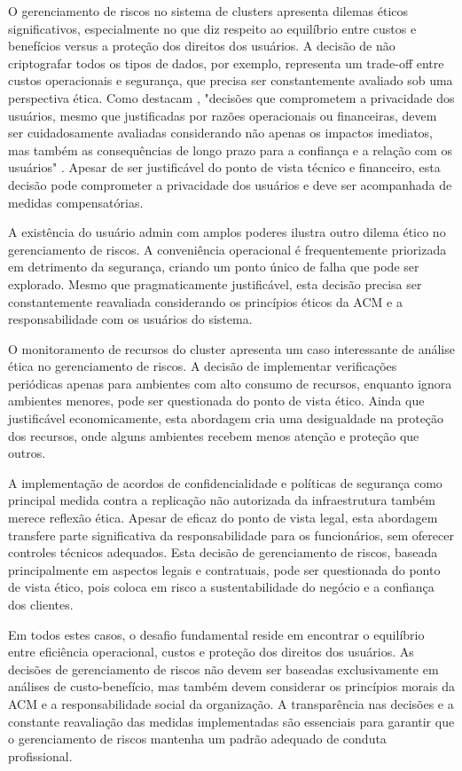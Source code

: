 O gerenciamento de riscos no sistema de clusters apresenta dilemas éticos significativos, especialmente no que diz respeito ao equilíbrio entre custos e benefícios versus a proteção dos direitos dos usuários. A decisão de não criptografar todos os tipos de dados, por exemplo, representa um trade-off entre custos operacionais e segurança, que precisa ser constantemente avaliado sob uma perspectiva ética. Como destacam \citeauthor{belanger2011privacy}, "decisões que comprometem a privacidade dos usuários, mesmo que justificadas por razões operacionais ou financeiras, devem ser cuidadosamente avaliadas considerando não apenas os impactos imediatos, mas também as consequências de longo prazo para a confiança e a relação com os usuários" \cite{belanger2011privacy}. Apesar de ser justificável do ponto de vista técnico e financeiro, esta decisão pode comprometer a privacidade dos usuários e deve ser acompanhada de medidas compensatórias.

A existência do usuário admin com amplos poderes ilustra outro dilema ético no gerenciamento de riscos. A conveniência operacional é frequentemente priorizada em detrimento da segurança, criando um ponto único de falha que pode ser explorado. Mesmo que pragmaticamente justificável, esta decisão precisa ser constantemente reavaliada considerando os princípios éticos da ACM e a responsabilidade com os usuários do sistema.

O monitoramento de recursos do cluster apresenta um caso interessante de análise ética no gerenciamento de riscos. A decisão de implementar verificações periódicas apenas para ambientes com alto consumo de recursos, enquanto ignora ambientes menores, pode ser questionada do ponto de vista ético. Ainda que justificável economicamente, esta abordagem cria uma desigualdade na proteção dos recursos, onde alguns ambientes recebem menos atenção e proteção que outros.

A implementação de acordos de confidencialidade e políticas de segurança como principal medida contra a replicação não autorizada da infraestrutura também merece reflexão ética. Apesar de eficaz do ponto de vista legal, esta abordagem transfere parte significativa da responsabilidade para os funcionários, sem oferecer controles técnicos adequados. Esta decisão de gerenciamento de riscos, baseada principalmente em aspectos legais e contratuais, pode ser questionada do ponto de vista ético, pois coloca em risco a sustentabilidade do negócio e a confiança dos clientes.

Em todos estes casos, o desafio fundamental reside em encontrar o equilíbrio entre eficiência operacional, custos e proteção dos direitos dos usuários. As decisões de gerenciamento de riscos não devem ser baseadas exclusivamente em análises de custo-benefício, mas também devem considerar os princípios morais da ACM e a responsabilidade social da organização. A transparência nas decisões e a constante reavaliação das medidas implementadas são essenciais para garantir que o gerenciamento de riscos mantenha um padrão adequado de conduta profissional.
